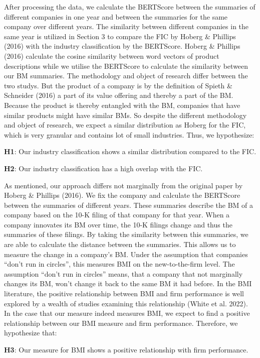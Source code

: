 \documentclass[
]{article}
\begin{document}
After processing the data, we calculate the BERTScore between the
summaries of different companies in one year and between the summaries
for the same company over different years. The similarity between
different companies in the same year is utilized in Section 3 to compare
the FIC by Hoberg \& Phillips (2016) with the industry classification by
the BERTScore. Hoberg \& Phillips (2016) calculate the cosine similarity
between word vectors of product descriptions while we utilise the
BERTScore to calculate the similarity between our BM summaries. The
methodology and object of research differ between the two studys. But
the product of a company is by the definition of Spieth \& Schneider
(2016) a part of its value offering and thereby a part of the BM.
Because the product is thereby entangled with the BM, companies that
have similar products might have similar BMs. So despite the different
methodology and object of research, we expect a similar distribution as
Hoberg for the FIC, which is very granular and contains lot of small
industries. Thus, we hypothesize:

\textbf{H1}: Our industry classification shows a similar distribution
compared to the FIC.

\textbf{H2}: Our industry classification has a high overlap with the
FIC.

As mentioned, our approach differs not marginally from the original
paper by Hoberg \& Phillips (2016). We fix the company and calculate the
BERTScore between the summaries of different years. These summaries
describe the BM of a company based on the 10-K filing of that company
for that year. When a company innovates its BM over time, the 10-K
filings change and thus the summaries of these filings. By taking the
similarity between this summaries, we are able to calculate the distance
between the summaries. This allows us to measure the change in a
company's BM. Under the assumption that companies ``don't run in
circles'', this measures BMI on the new-to-the-firm level. The
assumption ``don't run in circles'' means, that a company that not
marginally changes its BM, won't change it back to the same BM it had
before. In the BMI literature, the positive relationship between BMI and
firm performance is well explored by a wealth of studies examining this
relationship (White et al. 2022). In the case that our measure indeed
measures BMI, we expect to find a positive relationship between our BMI
measure and firm performance. Therefore, we hypothesize that:

\textbf{H3}: Our measure for BMI shows a positive relationship with firm
performance.
\end{document}
